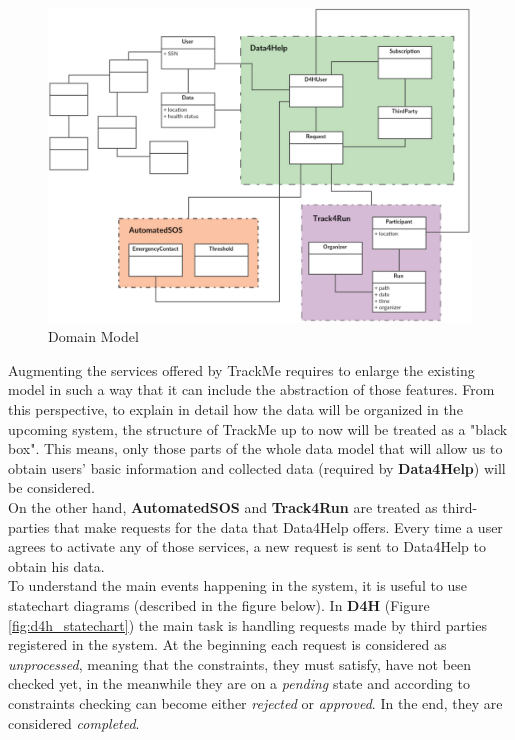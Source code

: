 \documentclass[hidelinks, 12pt]{report}
\begin{document}
 \begin{figure}[H]
\centering
 \includegraphics[scale=0.6]{Diagrams/domain_model.png}
\caption[Domain Model]{Domain Model}
\label{fig:domain_model}
\end{figure}

Augmenting the services offered by TrackMe requires to enlarge the existing model in such a way that it can include the abstraction of those features. From this perspective, to explain in detail how the data will be organized in the upcoming system, the structure of TrackMe up to now will be treated as a "black box". This means, only those parts of the whole data model that will allow us to obtain users' basic information and collected data (required by \textbf{Data4Help}) will be considered. \\

On the other hand, \textbf{AutomatedSOS} and \textbf{Track4Run} are treated as third-parties that make requests for the data that Data4Help offers. Every time a user agrees to activate any of those services, a new request is sent to Data4Help to obtain his data. \\

To understand the main events happening in the system, it is useful to use statechart diagrams (described in the figure below). In \textbf {D4H} (Figure \ref{fig:d4h_statechart}) the main task is handling requests made by third parties registered in the system. At the beginning each request is considered as \textit{unprocessed}, meaning that the constraints, they must satisfy, have not been checked yet, in the meanwhile they are on a \textit{pending} state and according to constraints checking can become either \textit{rejected} or \textit{approved}. In the end, they are considered \textit{completed}. \\
\end{document}
